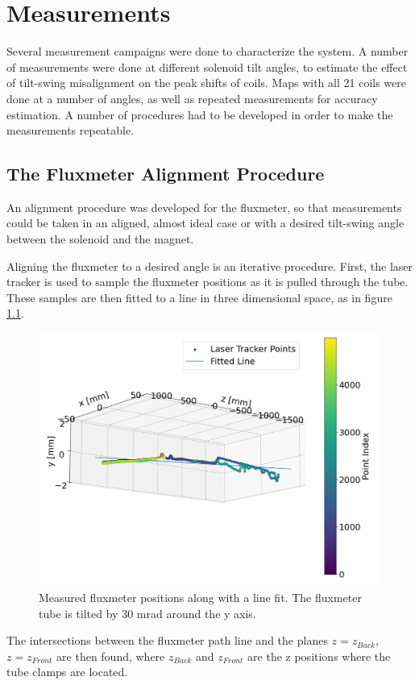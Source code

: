 \chapter{Measurements}
Several measurement campaigns were done to characterize the system.
A number of measurements were done at different solenoid tilt
angles, to estimate the effect of tilt-swing misalignment on 
the peak shifts of coils. Maps with all 21 coils
were done at a number of angles, as well as repeated measurements
for accuracy estimation. A number of procedures had to be developed
in order to make the measurements repeatable. 

\section{The Fluxmeter Alignment Procedure}
An alignment procedure was developed for the fluxmeter, so that
measurements could be taken in an aligned, almost ideal case
or with a desired tilt-swing angle between the solenoid and the magnet.

Aligning the fluxmeter to a desired angle is an iterative procedure.
First, the laser tracker is used to sample the fluxmeter positions
as it is pulled through the tube. These samples are then fitted to
a line in three dimensional space, as in figure \ref{fig:geomfit}.

\begin{figure}[!h]
    \centering
    \includegraphics[width=0.8\linewidth]{figs/geomfit}
    \caption{Measured fluxmeter positions along with a line
    fit. The fluxmeter tube is tilted by $30$ mrad around the y axis.}
    \label{fig:geomfit}
\end{figure}

The intersections between the fluxmeter path line and the 
planes $z = z_{Back}$, $z = z_{Front}$ are then found, where
$z_{Back}$ and $z_{Front}$ are the z positions where the tube clamps
are located.

